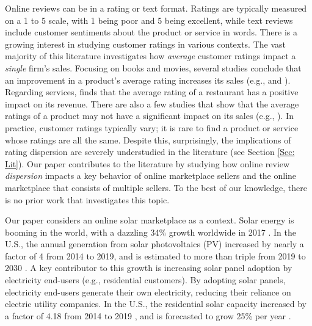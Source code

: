 \documentclass[msom,blindrev]{informs3}
\begin{document}
	
	
	
	Online reviews can be in a rating or text format. Ratings are typically measured on a 1 to 5 scale, with 1 being poor and 5 being excellent, while text reviews include customer sentiments about the product or service in words.  There is a growing interest in studying customer ratings in various contexts. The vast majority of this literature investigates how \emph{average} customer ratings impact a \emph{single} firm's sales. Focusing on books and movies, several studies conclude that an improvement in a product's average rating
	increases its sales (e.g., \cite{chintagunta2010effects} and \cite{chevalier2006effect}). Regarding services, \cite{luca2016reviews} finds that the average rating of a restaurant has a positive impact on its revenue. There are also a few studies that show that the average ratings of a product may not have a significant impact on its sales (e.g., \cite{duan2008online}).  In practice, customer ratings typically vary; it is rare to find a product or service whose ratings are all the same. Despite this, surprisingly, the implications of rating dispersion are severely understudied in the literature (see Section \ref{Sec: Lit}). Our paper contributes to the literature by studying how online review \emph{dispersion} impacts  a key behavior of online marketplace sellers and the online marketplace that consists of multiple sellers. To the best of our knowledge, there is no prior work that investigates this topic.
	
	
	Our paper considers an online solar marketplace as a context. Solar energy is booming in the world, with a dazzling 34\% growth worldwide in 2017 \citep{iea2018snapshot}. In the U.S., the annual generation from solar photovoltaics (PV) increased by nearly a factor of 4 from 2014 to 2019, and is estimated to more than triple from 2019 to 2030 \citep{USEIA-I,USEIA-II}. A key contributor to this growth is increasing solar panel adoption by electricity end-users (e.g., residential customers). By adopting solar panels, electricity end-users generate their own electricity, reducing their reliance on electric utility companies. In the U.S., the residential solar capacity increased by a factor of 4.18 from 2014 to 2019 \citep{USEIA-III}, and is forecasted to grow 25\% per year \citep{weaver_2019,seia,gtmsolar2018}.
	
\end{document}
